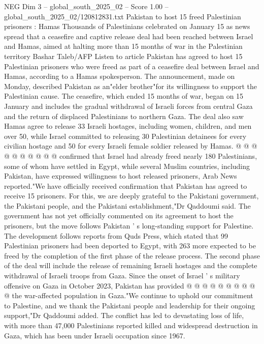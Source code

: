 \begin{textsample}{NEG Dim 3 – global\_south\_2025\_02 – Score 1.00 – global\_south\_2025\_02/120812831.txt}  \label{ex:f3_neg_049}
Pakistan to host 15 freed Palestinian prisoners : Hamas Thousands of Palestinians celebrated on January 15 as news spread that a ceasefire and captive release deal had been reached between Israel and Hamas, aimed at halting more than 15 months of war in the Palestinian territory Bashar Taleb/AFP Listen to article Pakistan has agreed to host 15 Palestinian prisoners who were freed as part of a ceasefire deal between Israel and Hamas, according to a Hamas spokesperson.
The announcement, made on Monday, described Pakistan as an"elder brother"for its willingness to support the Palestinian cause.
The ceasefire, which ended 15 months of war, began on 15 January and includes the gradual withdrawal of Israeli forces from central Gaza and the return of displaced Palestinians to northern Gaza.
The deal also saw Hamas agree to release 33 Israeli hostages, including women, children, and men over 50, while Israel committed to releasing 30 Palestinian detainees for every civilian hostage and 50 for every Israeli female soldier released by Hamas. @ @ @ @ @ @ @ @ @ @ confirmed that Israel had already freed nearly 180 Palestinians, some of whom have settled in Egypt, while several Muslim countries, including Pakistan, have expressed willingness to host released prisoners, Arab News reported."We have officially received confirmation that Pakistan has agreed to receive 15 prisoners.
For this, we are deeply grateful to the Pakistani government, the Pakistani people, and the Pakistani establishment,"Dr Qaddoumi said.
The government has not yet officially commented on its agreement to host the prisoners, but the move follows Pakistan ' s long-standing support for Palestine.
The development follows reports from Quds Press, which stated that 99 Palestinian prisoners had been deported to Egypt, with 263 more expected to be freed by the completion of the first phase of the release process.
The second phase of the deal will include the release of remaining Israeli hostages and the complete withdrawal of Israeli troops from Gaza.
Since the onset of Israel ' s military offensive on Gaza in October 2023, Pakistan has provided @ @ @ @ @ @ @ @ @ @ the war-affected population in Gaza."We continue to uphold our commitment to Palestine, and we thank the Pakistani people and leadership for their ongoing support,"Dr Qaddoumi added.
The conflict has led to devastating loss of life, with more than 47,000 Palestinians reported killed and widespread destruction in Gaza, which has been under Israeli occupation since 1967.

\end{textsample}
